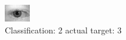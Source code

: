 \begin{figure}[h!]
\begin{center}
\includegraphics[width=0.60\columnwidth]{figures/ID548_class_2_target_3.png}
\end{center}
\caption{ Classification: 2 actual target: 3}
\label{fig:ID548_class_2_target_3}
\end{figure}
